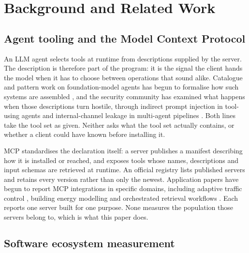 \documentclass[a4paper,fleqn]{cas-dc}
\begin{document}
\section{Background and Related Work}\label{sec:related}

\subsection{Agent tooling and the Model Context Protocol}

An LLM agent selects tools at runtime from descriptions supplied by the server.
The description is therefore part of the program: it is the signal the client
hands the model when it has to choose between operations that sound alike.
Catalogue and
pattern work on foundation-model agents has begun to formalise how such systems
are assembled \citep{agentpatterns2025}, and the security community has
examined what happens when those descriptions turn hostile, through indirect
prompt injection in tool-using agents \citep{khan2026promptinjection} and
internal-channel leakage in multi-agent pipelines \citep{yagoubi2026agentleak}.
Both lines take the tool set as given. Neither asks what the tool set actually
contains, or whether a client could have known before installing it.

MCP standardises the declaration itself: a server publishes a manifest
describing how it is installed or reached, and exposes tools whose names,
descriptions and input schemas are retrieved at runtime. An official registry
lists published servers and retains every version rather than only the newest.
Application papers have begun to report MCP integrations in specific domains,
including adaptive traffic control \citep{othmani2026mcp}, building energy
modelling \citep{ball2026openstudio} and orchestrated retrieval workflows
\citep{zhou2026mcp}. Each reports one server built for one purpose. None
measures the population those servers belong to, which is what this paper does.

\subsection{Software ecosystem measurement}
\end{document}
